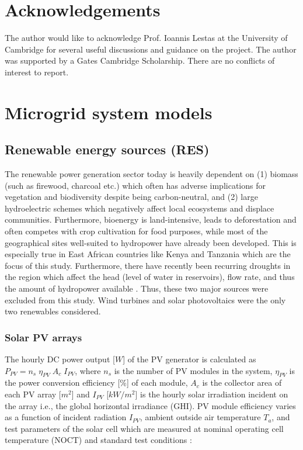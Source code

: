 \documentclass[final,3p,times]{elsarticle}
\begin{document}
\section{Acknowledgements}
The author would like to acknowledge Prof. Ioannis Lestas at the University of Cambridge for several useful discussions and guidance on the project. The author was supported by a Gates Cambridge Scholarship. There are no conflicts of interest to report.

\newpage

\appendix
{}

\section{Microgrid system models \label{app:mg_models}}

\subsection{Renewable energy sources (RES)}

The renewable power generation sector today is heavily dependent on (1) biomass (such as firewood, charcoal etc.) which often has adverse implications for vegetation and biodiversity despite being carbon-neutral, and (2) large hydroelectric schemes which negatively affect local ecosystems and displace communities. Furthermore, bioenergy is land-intensive, leads to deforestation and often competes with crop cultivation for food purposes, while most of the geographical sites well-suited to hydropower have already been developed. This is especially true in East African countries like Kenya and Tanzania which are the focus of this study. Furthermore, there have recently been recurring droughts in the region which affect the head (level of water in reservoirs), flow rate, and thus the amount of hydropower available \cite{usea}. Thus, these two major sources were excluded from this study. Wind turbines and solar photovoltaics were the only two renewables considered. 

\subsubsection{Solar PV arrays}

The hourly DC power output [$W$] of the PV generator is calculated as $P_{PV} = n_s \; \eta_{PV} \; A_c \; I_{PV} $\cite{tazvinga2013}, where $n_s$ is the number of PV modules in the system, $\eta_{PV}$ is the power conversion efficiency [\%] of each module, $A_c$ is the collector area of each PV array [$m^2$] and $I_{PV}$ [$kW/m^2$] is the hourly solar irradiation incident on the array i.e., the global horizontal irradiance (GHI). PV module efficiency varies as a function of incident radiation $I_{PV}$, ambient outside air temperature $T_a$, and test parameters of the solar cell which are measured at nominal operating cell temperature (NOCT) and standard test conditions \cite{tazvinga2013}:
\end{document}
